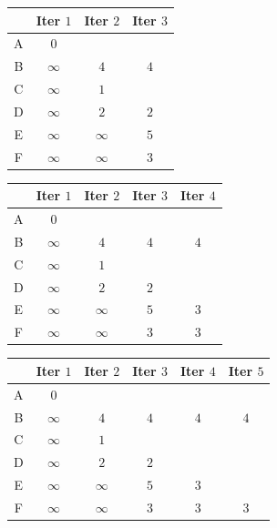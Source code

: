 \documentclass{article}
\begin{document}
\begin{center}
 \begin{tabular}{| c || c | c | c |} 
 \hline
 \, & Iter $1$ & Iter $2$ & Iter $3$ \\ [0.5ex] 
 \hline\hline
A & $0$ & \, & \, \\ 
 \hline
B & $\infty$ & $4$ & $4$ \\
 \hline
C & $\infty$ & $1$ & \, \\
 \hline
D & $\infty$ & $2$ & $2$ \\
 \hline
E & $\infty$ & $\infty$ & $5$ \\
 \hline
F & $\infty$ & $\infty$ & $3$ \\
 \hline
\end{tabular}
\end{center}

\begin{center}
 \begin{tabular}{| c || c | c | c | c |} 
 \hline
 \, & Iter $1$ & Iter $2$ & Iter $3$ & Iter $4$ \\ [0.5ex] 
 \hline\hline
A & $0$ & \, & \, & \, \\ 
 \hline
B & $\infty$ & $4$ & $4$ & $4$ \\
 \hline
C & $\infty$ & $1$ & \, & \, \\
 \hline
D & $\infty$ & $2$ & $2$ & \, \\
 \hline
E & $\infty$ & $\infty$ & $5$ & $3$ \\
 \hline
F & $\infty$ & $\infty$ & $3$ & $3$ \\
 \hline
\end{tabular}
\end{center}

\begin{center}
 \begin{tabular}{| c || c | c | c | c | c |} 
 \hline
 \, & Iter $1$ & Iter $2$ & Iter $3$ & Iter $4$ & Iter $5$ \\ [0.5ex] 
 \hline\hline
A & $0$ & \, & \, & \, & \, \\ 
 \hline
B & $\infty$ & $4$ & $4$ & $4$ & $4$ \\
 \hline
C & $\infty$ & $1$ & \, & \, & \, \\
 \hline
D & $\infty$ & $2$ & $2$ & \, & \, \\
 \hline
E & $\infty$ & $\infty$ & $5$ & $3$ & \, \\
 \hline
F & $\infty$ & $\infty$ & $3$ & $3$ & $3$ \\
 \hline
\end{tabular}
\end{center}
\end{document}

